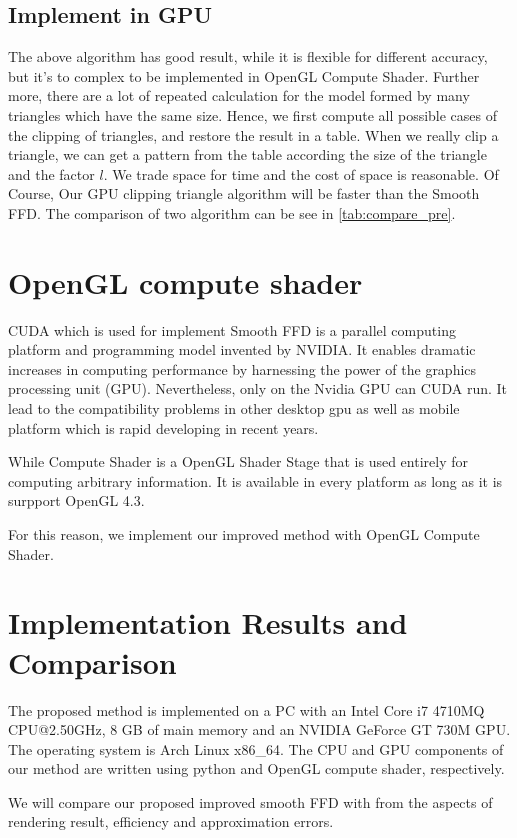 \documentclass[3p]{elsarticle}
\begin{document}
\subsection{Implement in GPU}
The above algorithm has good result, while it is flexible for different accuracy, but it's to complex to be implemented in OpenGL Compute Shader. Further more, there are a lot of repeated calculation for the model formed by many triangles which have the same size.
Hence, we first compute all possible cases of the clipping of triangles, and restore the result in a table. When we really clip a triangle, we can get a pattern from the table according the size of the triangle and the factor $l$. We trade space for time and the cost of space is reasonable. Of Course, Our GPU clipping triangle algorithm will be faster than the Smooth FFD. The comparison of two algorithm can be see in \ref{tab:compare_pre}.

\section{OpenGL compute shader}
CUDA which is used for implement Smooth FFD is a parallel computing platform and programming model invented by NVIDIA. It enables dramatic increases in computing performance by harnessing the power of the graphics processing unit (GPU). Nevertheless, only on the Nvidia GPU can CUDA run. It lead to the compatibility problems in other desktop gpu as well as mobile platform which is rapid developing in recent years.

While Compute Shader is a OpenGL Shader Stage that is used entirely for computing arbitrary information. It is available in every platform as long as it is surpport OpenGL 4.3.

For this reason, we implement our improved method with OpenGL Compute Shader. 

\section{Implementation Results and Comparison}

The proposed method is implemented on a PC with an Intel Core i7 4710MQ CPU@2.50GHz, 8 GB of main memory and an NVIDIA GeForce GT 730M GPU. The operating system is Arch Linux x86\_64. The CPU and GPU components of our method are written using python and OpenGL compute shader, respectively. 

We will compare our proposed improved smooth FFD with \cite{Cui15} from the aspects of rendering result, efficiency and approximation errors.
\end{document}
